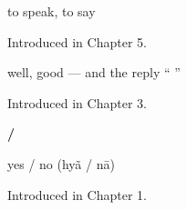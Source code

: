 \noindent\begin{minipage}[t]{\linewidth}
\raggedright
\textbf{}\par
\small to speak, to say\par
\footnotesize Introduced in Chapter 5.
\end{minipage}\par\medskip

\noindent\begin{minipage}[t]{\linewidth}
\raggedright
\textbf{}\par
\small well, good — and the reply \textquotedblleft{}  \textquotedblright{}\par
\footnotesize Introduced in Chapter 3.
\end{minipage}\par\medskip

\noindent\begin{minipage}[t]{\linewidth}
\raggedright
\textbf{ / }\par
\small yes / no (hyã / nā)\par
\footnotesize Introduced in Chapter 1.
\end{minipage}\par\medskip
